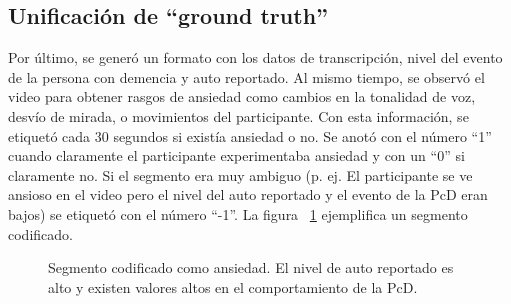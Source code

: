 	\subsection{Unificaci\'on de ``ground truth''}
	Por \'ultimo, se gener\'o un formato con los datos de transcripci\'on, nivel del evento de la persona con demencia y auto reportado. Al mismo tiempo, se observ\'o el video para obtener rasgos de ansiedad como cambios en la tonalidad de voz, desv\'io de mirada, o movimientos del participante. Con esta informaci\'on, se etiquet\'o cada 30 segundos si exist\'ia ansiedad o no. Se anot\'o con el n\'umero ``1'' cuando claramente el participante experimentaba ansiedad y con un ``0'' si claramente no. Si el segmento era muy ambiguo (p. ej. El participante se ve ansioso en el video pero el nivel del auto reportado y el evento de la PcD eran bajos) se etiquet\'o con el n\'umero ``-1''. La figura ~\ref{fig:imggtlabel} ejemplifica un segmento codificado.
	\begin{figure}[h!]
		\centering
		\caption{Segmento codificado como ansiedad. El nivel de auto reportado es alto y existen valores altos en el comportamiento de la PcD. }\label{fig:imggtlabel}
	\end{figure}
